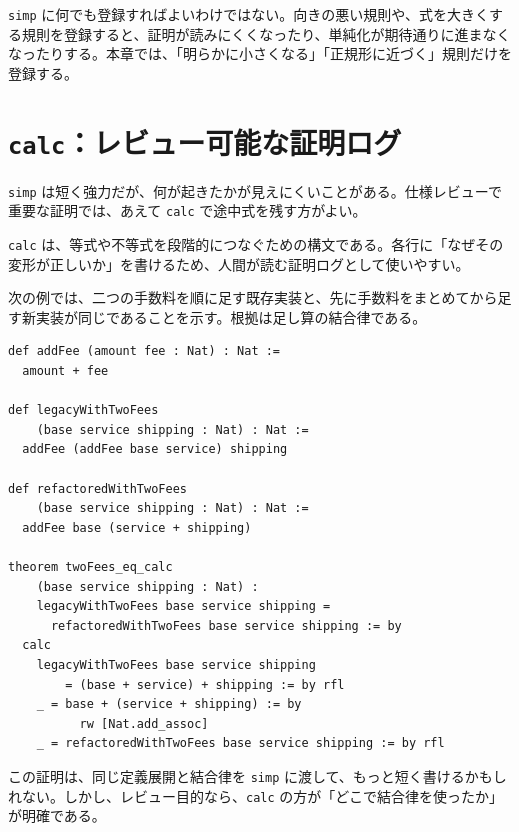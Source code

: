 \begin{warningbox}
\texttt{simp} に何でも登録すればよいわけではない。向きの悪い規則や、式を大きくする規則を登録すると、証明が読みにくくなったり、単純化が期待通りに進まなくなったりする。本章では、「明らかに小さくなる」「正規形に近づく」規則だけを登録する。
\end{warningbox}

\section{\texttt{calc}：レビュー可能な証明ログ}

\texttt{simp} は短く強力だが、何が起きたかが見えにくいことがある。仕様レビューで重要な証明では、あえて \texttt{calc} で途中式を残す方がよい。

\begin{definitionbox}
\texttt{calc} は、等式や不等式を段階的につなぐための構文である。各行に「なぜその変形が正しいか」を書けるため、人間が読む証明ログとして使いやすい。
\end{definitionbox}

次の例では、二つの手数料を順に足す既存実装と、先に手数料をまとめてから足す新実装が同じであることを示す。根拠は足し算の結合律である。

\begin{listing}[htbp]
\begin{verbatim}
def addFee (amount fee : Nat) : Nat :=
  amount + fee

def legacyWithTwoFees
    (base service shipping : Nat) : Nat :=
  addFee (addFee base service) shipping

def refactoredWithTwoFees
    (base service shipping : Nat) : Nat :=
  addFee base (service + shipping)

theorem twoFees_eq_calc
    (base service shipping : Nat) :
    legacyWithTwoFees base service shipping =
      refactoredWithTwoFees base service shipping := by
  calc
    legacyWithTwoFees base service shipping
        = (base + service) + shipping := by rfl
    _ = base + (service + shipping) := by
          rw [Nat.add_assoc]
    _ = refactoredWithTwoFees base service shipping := by rfl
\end{verbatim}
\caption{\texttt{calc} による段階的な等式証明}
\label{lst:ch12-calc}
\end{listing}

この証明は、同じ定義展開と結合律を \texttt{simp} に渡して、もっと短く書けるかもしれない。しかし、レビュー目的なら、\texttt{calc} の方が「どこで結合律を使ったか」が明確である。

